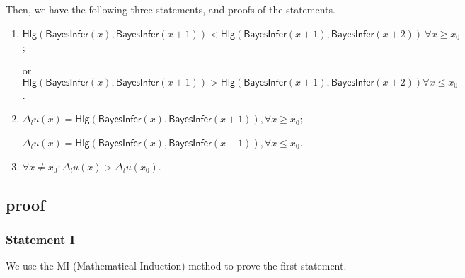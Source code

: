 \documentclass{article}
\begin{document}
Then, we have the following three statements, and proofs of the statements.
\renewcommand{\labelenumi}{\Roman{enumi}}
\begin{enumerate}
\item $\mathsf{Hlg} (\mathsf{BayesInfer}(x), \mathsf{BayesInfer}(x + 1)) < \mathsf{Hlg} (\mathsf{BayesInfer}(x + 1), \mathsf{BayesInfer}(x + 2))\ \forall x \geq x_0$;

or $\mathsf{Hlg} (\mathsf{BayesInfer}(x), \mathsf{BayesInfer}(x + 1)) > \mathsf{Hlg} (\mathsf{BayesInfer}(x + 1), \mathsf{BayesInfer}(x + 2))\forall x \leq x_0$.

\item $\Delta_{l}u(x) = \mathsf{Hlg} (\mathsf{BayesInfer}(x),\mathsf{BayesInfer}(x + 1)),\forall x \geq x_0$;

$\Delta_{l}u(x) = \mathsf{Hlg} (\mathsf{BayesInfer}(x),\mathsf{BayesInfer}(x - 1)),\forall x \leq x_0$.

\item $\forall x \neq x_0: \Delta_{l}u(x) > \Delta_{l}u(x_0)$.
\end{enumerate}

\subsection{proof}

\subsubsection{Statement I}
We use the MI (Mathematical Induction) method to prove the first statement.
\end{document}
